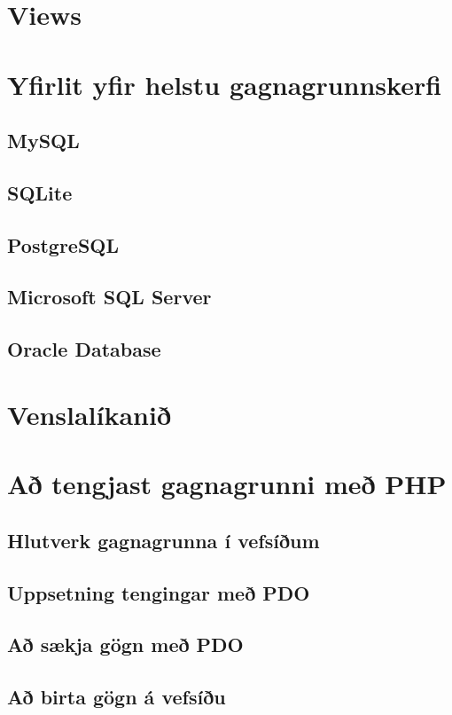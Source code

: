 \section{Views}
\section{Yfirlit yfir helstu gagnagrunnskerfi}
\label{undirkafli:helstu-gagnagrunnskerfi}
\subsection{MySQL}
\subsection{SQLite}
\subsection{PostgreSQL}
\subsection{Microsoft SQL Server}
\subsection{Oracle Database}
\section{Venslalíkanið}
\section{Að tengjast gagnagrunni með PHP}
\subsection{Hlutverk gagnagrunna í vefsíðum}
\subsection{Uppsetning tengingar með PDO}
\subsection{Að sækja gögn með PDO}
\subsection{Að birta gögn á vefsíðu}